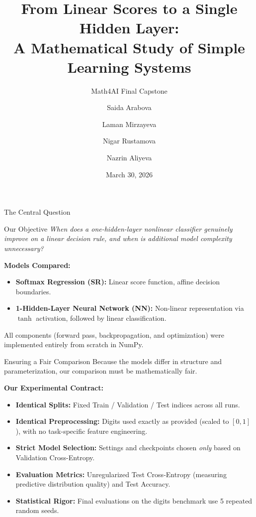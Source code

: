 \documentclass[11pt,aspectratio=169]{beamer}
\title[From Linear Scores to a Single Hidden Layer]{From Linear Scores to a Single Hidden Layer:\\A Mathematical Study of Simple Learning Systems}
\subtitle{Math4AI Final Capstone}
\author[Team]{Saida Arabova \and Laman Mirzayeva \and Nigar Rustamova  \and Nazrin Aliyeva}
\institute{National AI Center - AI Academy}
\date{March 30, 2026}
\begin{document}
\begin{frame}
    \titlepage
\end{frame}

\begin{frame}{The Central Question}
    \begin{block}{Our Objective}
        \textit{When does a one-hidden-layer nonlinear classifier genuinely improve on a linear decision rule, and when is additional model complexity unnecessary?}
    \end{block}
    
    \vspace{0.5em}
    \textbf{Models Compared:}
    \begin{itemize}
        \item \textbf{Softmax Regression (SR):} Linear score function, affine decision boundaries.
        \item \textbf{1-Hidden-Layer Neural Network (NN):} Non-linear representation via $\tanh$ activation, followed by linear classification.
    \end{itemize}
    
    \vspace{0.5em}
    All components (forward pass, backpropagation, and optimization) were implemented entirely from scratch in NumPy.
\end{frame}

\begin{frame}{Ensuring a Fair Comparison}
    Because the models differ in structure and parameterization, our comparison must be mathematically fair.
    
    \vspace{1em}
    \textbf{Our Experimental Contract:}
    \begin{itemize}
        \item \textbf{Identical Splits:} Fixed Train / Validation / Test indices across all runs.
        \item \textbf{Identical Preprocessing:} Digits used exactly as provided (scaled to $[0,1]$), with no task-specific feature engineering.
        \item \textbf{Strict Model Selection:} Settings and checkpoints chosen \textit{only} based on Validation Cross-Entropy.
        \item \textbf{Evaluation Metrics:} Unregularized Test Cross-Entropy (measuring predictive distribution quality) and Test Accuracy.
        \item \textbf{Statistical Rigor:} Final evaluations on the digits benchmark use 5 repeated random seeds.
    \end{itemize}
\end{frame}
\end{document}
